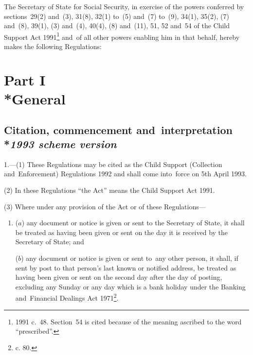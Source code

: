 \documentclass[12pt,a4paper]{article}
\title{\regstitle}
\author{S.I.~1992 No.~1989}
\date{Made 17th August 1992\\Laid before Parliament 26th August 1992\\Coming into~force 5th April 1993}
\begin{document}
\maketitle

\noindent
The Secretary of State for Social Security, in exercise of the powers conferred by sections~29(2) and~(3), 31(8), 32(1) to~(5) and~(7) to~(9), 34(1), 35(2), (7) and~(8), 39(1), (3) and~(4), 40(4), (8) and~(11), 51, 52 and~54 of the Child Support Act 1991\footnote{1991 c.~48. Section~54 is cited because of the meaning ascribed to the word “prescribed”.} and~of all other powers enabling him in that behalf, hereby makes the following Regulations:

{\sloppy

\tableofcontents

}

\setcounter{secnumdepth}{-2}

\section[Part I --- General]{Part I\\*General}

\subsection[1. Citation, commencement and~interpretation --- \emph{1993 scheme version}]{Citation, commencement and~interpretation\\*\emph{1993 scheme version}}

\renewcommand\parthead{--- Part I}

1.—(1) These Regulations may be cited as the Child Support (Collection and~Enforcement) Regulations 1992 and shall come into~force on 5th April 1993.

(2) In these Regulations “the Act” means the Child Support Act 1991.

(3) Where under any provision of the Act or of these Regulations—
\begin{enumerate}\item[]
($a$) any document or notice is given or sent to the Secretary of State, it shall be treated as having been given or sent on the day it is received by the Secretary of State; and

($b$) any document or notice is given or sent to~any other person, it shall, if sent by post to that person’s last known or notified address, be treated as having been given or sent on the second day after the day of posting, excluding any Sunday or any day which is a bank holiday under the Banking and~Financial Dealings Act 1971\footnote{ c. 80.}.
\end{enumerate}
\end{document}
